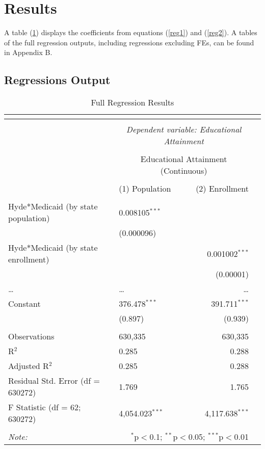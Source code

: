 \section{Results}

    A table (\ref{full_reg}) displays the coefficients from equations (\ref{reg1}) and (\ref{reg2}). A tables of the full regression outputs, including regressions excluding FEs, can be found in Appendix B.

    \subsection{Regressions Output}
        \begingroup\tiny
        \begin{longtable}{ll|rr}
        \caption{Full Regression Results} \\
        \label{full_reg}
        \\ [-4ex]\hline
        \hline \\[-4ex]
        & \multicolumn{2}{c}{\textit{Dependent variable: Educational Attainment}} \\
        \cline{2-3}
        \\[-4ex] & \multicolumn{2}{c}{Educational Attainment (Continuous)} \\ 
        \\[-4ex] & (1) Population & (2) Enrollment\\
        \hline \\[-4ex]
            Hyde*Medicaid (by state population) & 0.008105$^{***}$ &  \\
            & (0.000096) &  \\
            Hyde*Medicaid (by state enrollment) &  & 0.001002$^{***}$ \\
            &  & (0.00001) \\
            \ldots&\ldots&\ldots\\
            Constant & 376.478$^{***}$ & 391.711$^{***}$ \\
            & (0.897) & (0.939) \\
            \hline \\[-4ex]
            Observations & 630,335 & 630,335 \\
            R$^{2}$ & 0.285 & 0.288 \\
            Adjusted R$^{2}$ & 0.285 & 0.288 \\
            Residual Std. Error (df = 630272) & 1.769 & 1.765 \\
            F Statistic (df = 62; 630272) & 4,054.023$^{***}$ & 4,117.638$^{***}$\\
        \hline
        \hline \\[-4ex]
        \textit{Note:}  & \multicolumn{2}{r}{$^{*}$p$<$0.1; $^{**}$p$<$0.05; $^{***}$p$<$0.01} \\
        \end{longtable}
        \endgroup

